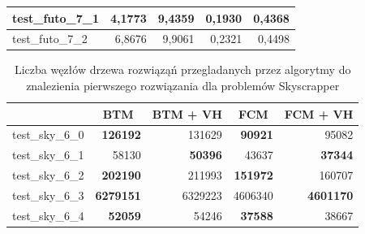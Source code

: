 \documentclass{article}
\begin{document}
\begin{table}[H]
\begin{center}
\begin{tabular}{|l|r|r|r|r|}
			test\_futo\_7\_1 & 4,1773                            & 9,4359                                 & 0,1930                            & 0,4368                                 \\ \hline
			test\_futo\_7\_2 & 6,8676                            & 9,9061                                 & 0,2321                            & 0,4498                                 \\ \hline
		\end{tabular}
	\end{center}
\end{table}

\begin{table}[H]
	\caption{Liczba węzłów drzewa rozwiąząń przegladanych przez algorytmy do znalezienia pierwszego rozwiązania dla problemów Skyscrapper}
	\label{tab:vh_sky_number}
	\begin{center}
		\begin{tabular}{|l|r|r|r|r|}
			\hline
			& \multicolumn{1}{c|}{\textbf{BTM}} & \multicolumn{1}{c|}{\textbf{BTM + VH}} & \multicolumn{1}{c|}{\textbf{FCM}} & \multicolumn{1}{c|}{\textbf{FCM + VH}} \\ \hline
			test\_sky\_6\_0 & \textbf{126192}                   & 131629                                 & \textbf{90921}                    & 95082                                  \\ \hline
			test\_sky\_6\_1 & 58130                             & \textbf{50396}                         & 43637                             & \textbf{37344}                         \\ \hline
			test\_sky\_6\_2 & \textbf{202190}                   & 211993                                 & \textbf{151972}                   & 160707                                 \\ \hline
			test\_sky\_6\_3 & \textbf{6279151}                  & 6329223                                & 4606340                           & \textbf{4601170}                       \\ \hline
			test\_sky\_6\_4 & \textbf{52059}                    & 54246                                  & \textbf{37588}                    & 38667                                  \\ \hline
		\end{tabular}
	\end{center}
\end{table}
\end{document}
